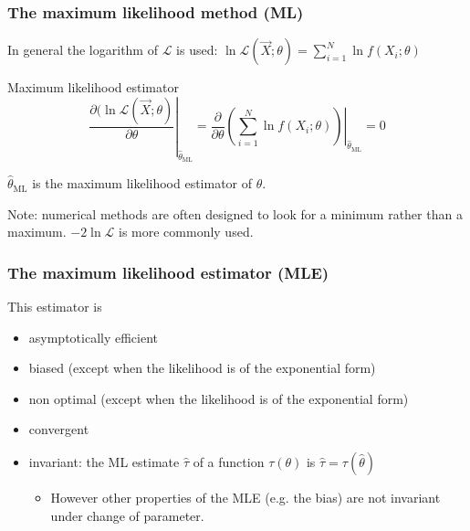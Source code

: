 \documentclass[9pt]{beamer}
\begin{document}
\begin{frame}
 \frametitle{The maximum likelihood method (ML)}
 
 In general the logarithm of $\mathcal{L}$ is used: $\ln \mathcal{L}\left(\vec{X};\theta\right) = \sum_{i=1}^N \ln f(X_i;\theta)$
 
 \begin{block}{Maximum likelihood estimator}
  $$\left. \frac{\partial (\ln \mathcal{L} \left(\vec{X};\theta\right)}{\partial \theta}\right|_{\hat{\theta}_\text{ML}} = \left.\frac{\partial}{\partial \theta} \left(  \sum_{i=1}^N \ln f(X_i;\theta) \right)\right|_{\hat{\theta}_\text{ML}} = 0$$
  
  $\hat{\theta}_\text{ML}$ is the maximum likelihood estimator of $\theta$.
 \end{block}

 Note: numerical methods are often designed to look for a minimum rather than a maximum. $-2 \ln \mathcal{L}$ is more commonly used.
\end{frame}

\begin{frame}
 \frametitle{The maximum likelihood estimator (MLE)}
 
 This estimator is 
 \begin{itemize}
  \item asymptotically efficient
  \item biased (except when the likelihood is of the exponential form)
  \item non optimal (except when the likelihood is of the exponential form)
  \item convergent
  \item invariant: the ML estimate $\hat{\tau}$ of a function $\tau(\theta)$ is $\hat{\tau} = \tau(\hat{\theta})$
  \begin{itemize}
   \item However other properties of the MLE (e.g. the bias) are not invariant under change of parameter.
  \end{itemize}

 \end{itemize}

\end{frame}
\end{document}
